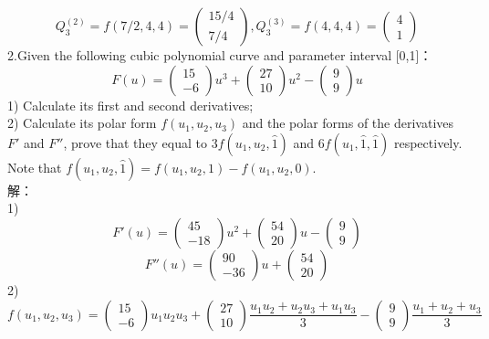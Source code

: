 \documentclass{article}
\begin{document}
	$$Q_3^{(2)}=f(7/2,4,4)=\left(\begin{array}{c} 15/4\\7/4 \end{array}\right),
	Q_3^{(3)}=f(4,4,4)=\left(\begin{array}{c} 4\\1 \end{array}\right)$$
	2.Given the following cubic polynomial curve and parameter interval [0,1]：\\
	\begin{equation*}
		F(u)=\left(\begin{array}{c}	15\\-6 \end{array}\right)u^3+
		\left(\begin{array}{c}	27\\10 \end{array}\right)u^2-
		\left(\begin{array}{c} 9\\9 \end{array}\right)u
	\end{equation*}
1) Calculate its first and second derivatives;\\
2) Calculate its polar form $f(u_1,u_2,u_3)$ and the polar forms of the derivatives $F'$ and $F''$, prove that they equal to 3$f(u_1, u_2, \hat{1})$ and 6$f(u_1, \hat{1},\hat{1})$ respectively.
Note that $f(u_1, u_2, \hat{1}) = f(u_1, u_2, 1) − f(u_1, u_2, 0)$.\\
解：\\
1)\\
$$F'(u)=\left(\begin{array}{c}	45\\-18 \end{array}\right)u^2+
\left(\begin{array}{c}	54\\20 \end{array}\right)u-
\left(\begin{array}{c} 9\\9 \end{array}\right)$$
$$F''(u)=\left(\begin{array}{c}	90\\-36 \end{array}\right)u+
\left(\begin{array}{c}	54\\20 \end{array}\right)$$
2)\\
$$f(u_1,u_2,u_3)=\left(\begin{array}{c}	15\\-6 \end{array}\right)u_1u_2u_3+
\left(\begin{array}{c}	27\\10 \end{array}\right)\frac{u_1u_2+u_2u_3+u_1u_3}{3}-
\left(\begin{array}{c} 9\\9 \end{array}\right)\frac{u_1+u_2+u_3}{3}$$
\end{document}
